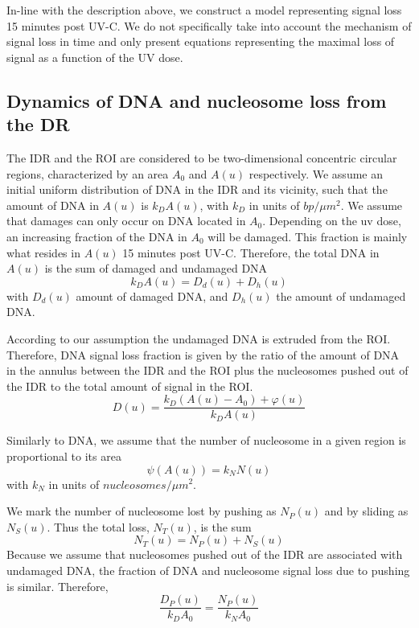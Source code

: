 \documentclass[12pt]{article}
\begin{document}
    In-line with the description above, we construct a model representing
	signal loss 15 minutes post UV-C. We do not specifically take into account the
	mechanism of signal loss in time and only present equations representing the maximal loss of signal as a function of the UV dose.
	
	\subsection{Dynamics of DNA and nucleosome loss from the DR}
	The IDR and the ROI are considered to be two-dimensional concentric circular regions, characterized by an area $A_0$ and $A(u)$ respectively. We assume an initial uniform distribution of DNA in the IDR and its vicinity, such that the amount of DNA in $A(u)$ is $k_DA(u)$, with $k_D$ in units of $bp/\mu m^2$. We assume that damages can only occur on DNA located in $A_0$. Depending on the uv dose, an increasing fraction of the DNA in $A_0$ will be damaged. This fraction is mainly what resides in $A(u)$ 15 minutes post UV-C. Therefore, the total DNA in $A(u)$ is the sum of damaged and undamaged DNA 
	\begin{equation}
	 k_DA(u)= D_d(u)+D_h(u)
	\end{equation}
	with $D_d(u)$ amount of damaged DNA, and $D_h(u)$ the amount of undamaged DNA.
	 
	According to our assumption the undamaged DNA is extruded from the ROI. Therefore, DNA signal loss fraction is given by the ratio of the amount of
	DNA in the annulus between the IDR and the ROI plus the nucleosomes
	pushed out of the IDR to the total amount of signal in the ROI. 
	\begin{equation}\label{eq:DNAstst}
	D(u) = \frac{k_D(A(u)-A_0) + \varphi(u)}{k_DA(u)}
	\end{equation}
	
	Similarly to DNA, we assume that the number of nucleosome in a given region is proportional to its area
	\begin{equation*}
	\psi(A(u))=k_NN(u)
	\end{equation*}
	with $k_N$ in units of $nucleosomes/\mu m^2$.
	
	We mark the number of nucleosome lost by pushing as $N_P(u)$ and by sliding as $N_S(u)$. Thus the total loss, $N_T(u)$, is the sum 
	\begin{equation*}
	N_T(u) = N_P(u) + N_S(u)
	\end{equation*}
	Because we assume that nucleosomes pushed out of the IDR are associated with undamaged DNA, the fraction of DNA and nucleosome signal loss due to pushing is similar. Therefore,
	\begin{equation*}
	\frac{D_P(u)}{k_DA_0} = \frac{N_P(u)}{k_NA_0}
	\end{equation*} 
	
\end{document}
